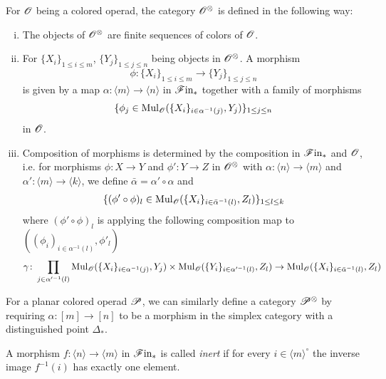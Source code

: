 \begin{defin}\label{def:Ox} For $\O$ being a colored operad, the category $\Ox$
    is defined in the following way:
    \begin{enumerate}[(i)]
        \item The objects of $\Ox$ are finite sequences of colors of $\O$.
        \item For $\{X_i\}_{1 \leq i \leq m}$, $\{Y_j\}_{1 \leq j \leq n}$ being
        objects in $\Ox$. A morphism 
        \[
            \phi \colon \{X_i\}_{1 \leq i \leq m} \to \{Y_j\}_{1 \leq j \leq n}
        \]
        is given by a map $\alpha \colon \langle m \rangle \to \langle n
        \rangle$ in $\Fin$ together with a family of morphisms
        \[
            \{ \phi_j \in \Mul_{\O}(\{X_i\}_{i \in \alpha^{-1}(j)}, Y_j)\}_{1 \leq j \leq n}
        \]
        in $\O$.
        \item Composition of morphisms is determined by the composition in
        $\Fin$ and $\O$, i.e. for morphisms $\phi \colon X \to Y$ and $\phi'
        \colon Y \to Z$ in $\Ox$  with $\alpha \colon \langle n \rangle \to
        \langle m \rangle$ and $\alpha' \colon \langle m \rangle \to \langle k
        \rangle$, we define $\bar{\alpha} = \alpha'\circ \alpha$ and
        \[
            \{(\phi' \circ \phi)_l \in  \Mul_{\O}(\{X_i\}_{i \in \bar{\alpha}^{-1}(l)}, Z_l)\}_{1 \leq l \leq k}
        \]
        where $(\phi' \circ \phi)_l$ is applying the following composition map
        to $((\phi_i)_{i \in \alpha^{-1}(l)}, \phi'_l)$
        \[
            \gamma \colon \prod_{j \in \alpha'^{-1}(l)} \Mul_{\O}(\{X_i\}_{i \in \alpha^{-1}(j)},Y_j) \times \Mul_{\O}(\{Y_i\}_{i \in \alpha'^{-1}(l)},Z_l) \to \Mul_{\O}(\{X_i\}_{i \in \bar{\alpha}^{-1}(l)},Z_l)
        \] 
    \end{enumerate}
\end{defin}

\begin{rem}
    For a planar colored operad $\P$, we can similarly define a category
    $\P^{\otimes}$ by requiring $\alpha \colon [m] \to [n]$ to be a morphism in
    the simplex category with a distinguished point $\Delta_{\ast}$.   
\end{rem}

\begin{defin}
    A morphism $f \colon \langle n \rangle \to \langle m \rangle$ in $\Fin$ is
    called {\em inert} if for every $i \in \langle m \rangle^{\circ}$ the
    inverse image $f^{-1}(i)$ has exactly one element.
\end{defin}

